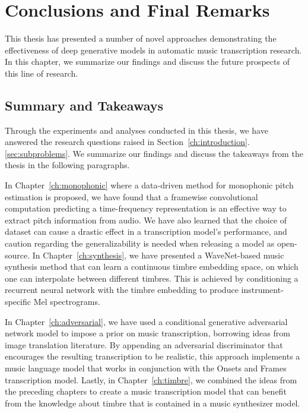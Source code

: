 
\graphicspath{{8-conclusions/figures/}}

\chapter{Conclusions and Final Remarks}
\label{ch:conclusions}

This thesis has presented a number of novel approaches demonstrating the effectiveness of deep generative models in automatic music transcription research.
In this chapter, we summarize our findings and discuss the future prospects of this line of research.

\section{Summary and Takeaways}


Through the experiments and analyses conducted in this thesis, we have answered the research questions raised in Section~\ref{ch:introduction}.\ref{sec:subproblems}.
We summarize our findings and discuss the takeaways from the thesis in the following paragraphs.

In Chapter~\ref{ch:monophonic} where a data-driven method for monophonic pitch estimation is proposed, we have found that a framewise convolutional computation predicting a time-frequency representation is an effective way to extract pitch information from audio.
We have also learned that the choice of dataset can cause a drastic effect in a transcription model's performance, and caution regarding the generalizability is needed when releasing a model as open-source.
In Chapter~\ref{ch:synthesis}, we have presented a WaveNet-based music synthesis method that can learn a continuous timbre embedding space, on which one can interpolate between different timbres.
This is achieved by conditioning a recurrent neural network with the timbre embedding to produce instrument-specific Mel spectrograms.

In Chapter~\ref{ch:adversarial}, we have used a conditional generative adversarial network model to impose a prior on music transcription, borrowing ideas from image translation literature.
By appending an adversarial discriminator that encourages the resulting transcription to be realistic, this approach implements a music language model that works in conjunction with the Onsets and Frames transcription model.
Lastly, in Chapter~\ref{ch:timbre}, we combined the ideas from the preceding chapters to create a music transcription model that can benefit from the knowledge about timbre that is contained in a music synthesizer model.


